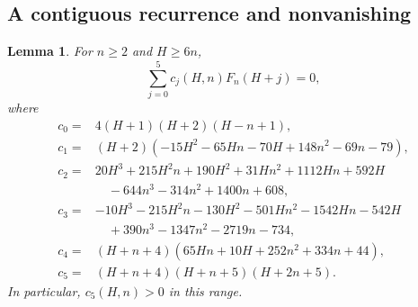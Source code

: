 \documentclass[11pt]{amsart}
\theoremstyle{plain}
\newtheorem{lemma}[theorem]{Lemma}
\theoremstyle{remark}\newtheorem{remark}[theorem]{Remark}
\numberwithin{equation}{section}
\begin{document}
\subsection{A contiguous recurrence and nonvanishing}\label{f:sec:nonvanishing}
\begin{lemma}\label{f:lem:recurrence}
For $n\geq2$ and $H\geq6n$,
\begin{equation}\label{f:eq:recurrence}
 \sum_{j=0}^5 c_j(H,n)F_n(H+j)=0,
\end{equation}
where
\begin{align*}
 c_0={}&4(H+1)(H+2)(H-n+1),\\
 c_1={}&(H+2)(-15H^2-65Hn-70H+148n^2-69n-79),\\
 c_2={}&20H^3+215H^2n+190H^2+31Hn^2+1112Hn+592H\\
       &\quad-644n^3-314n^2+1400n+608,\\
 c_3={}&-10H^3-215H^2n-130H^2-501Hn^2-1542Hn-542H\\
       &\quad+390n^3-1347n^2-2719n-734,\\
 c_4={}&(H+n+4)(65Hn+10H+252n^2+334n+44),\\
 c_5={}&(H+n+4)(H+n+5)(H+2n+5).
\end{align*}
In particular, $c_5(H,n)>0$ in this range.
\end{lemma}
\end{document}

